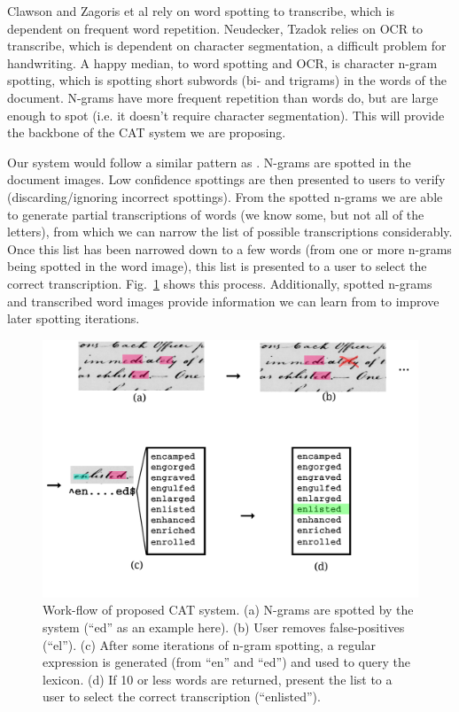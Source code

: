 \documentclass[conference]{IEEEtran}
\begin{document}
Clawson\cite{Clawson2014} and Zagoris et al\cite{Zagoris2015} rely on word spotting to transcribe, which is dependent on frequent word repetition. Neudecker, Tzadok\cite{Neudecker2010} relies on OCR to transcribe, which is dependent on character segmentation, a difficult problem for handwriting.
A happy median, to word spotting and OCR, is character n-gram spotting, which is spotting short subwords (bi- and trigrams) in the words of the document. N-grams have more frequent repetition than words do, but are large enough to spot (i.e. it doesn't require character segmentation). This will provide the backbone of the CAT system we are proposing.

Our system would follow a similar pattern as \cite{Neudecker2010}. N-grams are spotted in the document images. Low confidence spottings are then presented to users to verify (discarding/ignoring incorrect spottings). From the spotted n-grams we are able to generate partial transcriptions of words (we know some, but not all of the letters), from which we can narrow the list of possible transcriptions considerably. Once this list has been narrowed down to a few words (from one or more n-grams being spotted in the word image), this list is presented to a user to select the correct transcription. Fig.~\ref{fig:system_diagram} shows this process. Additionally, spotted n-grams and transcribed word images provide information we can learn from to improve later spotting iterations.

\begin{figure}
    \centering
    \includegraphics[width=.45\textwidth]{flow5}
    \caption{Work-flow of proposed CAT system. (a) N-grams are spotted by the system (``ed'' as an example here). (b) User removes false-positives (``el''). (c) After some iterations of n-gram spotting, a regular expression is generated (from ``en'' and ``ed'') and used to query the lexicon. (d) If 10 or less words are returned, present the list to a user to select the correct transcription (``enlisted'').}
    \label{fig:system_diagram}
\end{figure}
\end{document}
